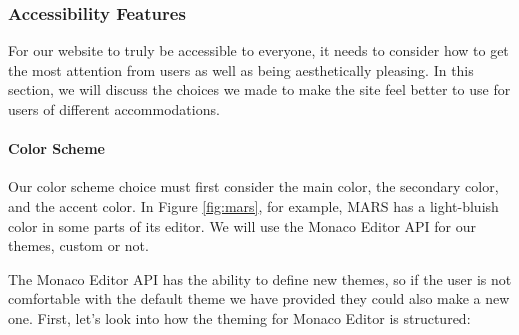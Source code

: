 \documentclass[
    paper=letter,
    parskip=half,
    fontsize=12pt,
    titlepage=firstiscover,
    toc=bibliography,
    numbers=endperiod
]{scrartcl}
\begin{document}
\subsubsection{Accessibility Features}
\label{subsec:accessibility-features}

For our website to truly be accessible to everyone, it needs to consider
how to get the most attention from users as well as being aesthetically
pleasing. In this section, we will discuss the choices we made to make
the site feel better to use for users of different accommodations.

\paragraph{Color Scheme}

Our color scheme choice must first consider the main color, the
secondary color, and the accent color. In Figure \ref{fig:mars}, for
example, MARS has a light-bluish color in some parts of its editor. We
will use the Monaco Editor API for our themes, custom or not.

The Monaco Editor API has the ability to define new themes, so if the
user is not comfortable with the default theme we have provided they
could also make a new one. First, let's look into how the theming for
Monaco Editor is structured:
\end{document}
